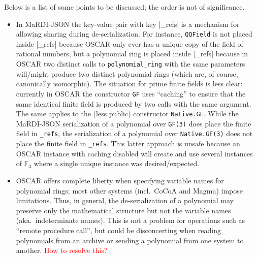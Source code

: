 \documentclass{article}
\newcommand{\blueverb}{\collectverb{\color{blue}\colorbox{gray!20}}}
\newcommand{\MaRDIJSON}{MaRDI-JSON}
\newcommand \FF {{\mathbb F}}
\def\red#1{\textcolor{red}{#1}}
\begin{document}
Below is a list of some points to be discussed; the order is
not of significance.
\begin{itemize}
  \setlength{\itemsep}{3pt}
\item In {\MaRDIJSON} the key-value pair with key \blueverb|_refs| is
  a mechanism for allowing sharing during de-serialization.  For instance,
  \verb|QQField| is not placed inside \blueverb|_refs| because OSCAR only
  ever has a unique copy of the field of rational numbers, but a polynomial
  ring is placed inside \blueverb|_refs| because in OSCAR two distinct calls
  to \verb|polynomial_ring| with the same parameters will/might produce two
  distinct polynomial rings (which are, of course, canonically isomorphic).
  The situation for prime finite fields is less clear: currently in OSCAR
  the constructor \verb|GF| uses ``caching'' to ensure that the same
  identical finite field is produced by two calls with the same argument.
  The same applies to the (less public) constructor \verb|Native.GF|.
  While the {\MaRDIJSON} serialization of a polynomial over \verb|GF(3)|
  does place the finite field in \verb|_refs|, the serialization of
  a polynomial over \verb|Native.GF(3)| does not place the finite field
  in \verb|_refs|.  This latter approach is unsafe because an OSCAR
  instance with caching disabled will create and use several instances
  of $\FF_3$ where a single unique instance was desired/expected.

\item OSCAR offers complete liberty when specifying variable names for
  polynomial rings; most other systems (incl.~CoCoA and Magma) impose
  limitations.  Thus, in general, the de-serialization of a polynomial
  may preserve only the mathematical structure but not the variable
  names (aka.~indeterminate names).  This is not a problem for operations
  such as ``remote procedure call'', but could be disconcerting when
  reading polynomials from an archive or sending a polynomial from
  one system to another.  \red{How to resolve this?}


\end{itemize}
\end{document}
